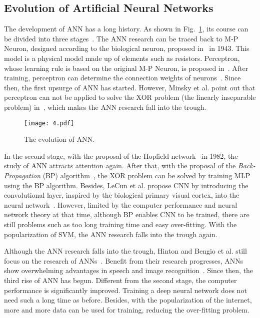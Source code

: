 \subsection{Evolution of Artificial Neural Networks}
The development of ANN has a long history. As shown in Fig.~\ref{fig4}, its course can be divided into three stages~\cite{Yamashita-2016-AIGD}. The ANN research can be traced back to M-P Neuron, designed according to the biological neuron, proposed in~\cite{Mcculloch-1943-ALCI} in 1943. This model is a physical model made up of elements such as resistors. Perceptron, whose learning rule is based on the original M-P Neuron, is proposed in~\cite{Rosenblatt-1958-PAPM}. After training, perceptron can determine the connection weights of neurons~\cite{Yamashita-2016-AIGD}. Since then, the first upsurge of ANN has started. However, Minsky et al. point out that perceptron can not be applied to solve the XOR problem (the linearly inseparable problem) in~\cite{Minsky-2017-PAIC}, which makes the ANN research fall into the trough.

\begin{figure}[htbp!]
\centering
\texttt{[image: 4.pdf]}
\caption{The evolution of ANN.}
\label{fig4}
\end{figure}



In the second stage, with the proposal of the Hopfield network~\cite{Hopfield-1982-NNPS} in 1982, the study of ANN attracts attention again. After that, with the proposal of the \emph{Back-Propagation} (BP) algorithm~\cite{Rumelhart-1986-LRBE}, the XOR problem can be solved by training MLP using the BP algorithm. Besides, LeCun et al. propose CNN by introducing the convolutional layer, inspired by the biological primary visual cortex, into the neural network~\cite{Lecun-1989-BAHZ,Lecun-1998-GLAD}. However, limited by the computer performance and neural network theory at that time, although BP enables CNN to be trained, there are still problems such as too long training time and easy over-fitting. With the popularization of SVM, the ANN research falls into the trough again.

Although the ANN research falls into the trough, Hinton and Bengio et al. still focus on the research of ANNs~\cite{Hinton-2002-TPEM,Hinton-2006-AFLA,Hinton-2006-RDDN,Nair-2010-RLUI,Salakhutdinov-2009-DBM,Bengio-2009-LDAA,Bengio-2007-GLTD,Glorot-2010-UDTD,Le-2008-RPRB}. Benefit from their research progresses, ANNs show overwhelming advantages in speech and image recognition~\cite{Krizhevsky-2017-ICDC}. Since then, the third rise of ANN has begun. Different from the second stage, the computer performance is significantly improved. Training a deep neural network does not need such a long time as before. Besides, with the popularization of the internet, more and more data can be used for training, reducing the over-fitting problem.


